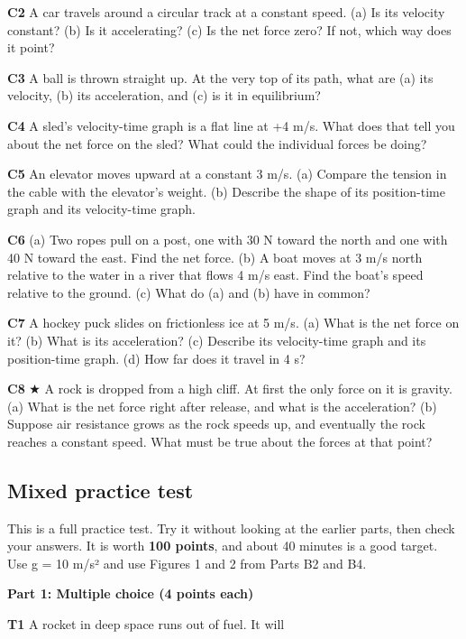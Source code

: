 \documentclass[
]{article}
\begin{document}
\textbf{C2} A car travels around a circular track at a constant speed.
(a) Is its velocity constant? (b) Is it accelerating? (c) Is the net
force zero? If not, which way does it point?

\textbf{C3} A ball is thrown straight up. At the very top of its path,
what are (a) its velocity, (b) its acceleration, and (c) is it in
equilibrium?

\textbf{C4} A sled's velocity-time graph is a flat line at +4 m/s. What
does that tell you about the net force on the sled? What could the
individual forces be doing?

\textbf{C5} An elevator moves upward at a constant 3 m/s. (a) Compare
the tension in the cable with the elevator's weight. (b) Describe the
shape of its position-time graph and its velocity-time graph.

\textbf{C6} (a) Two ropes pull on a post, one with 30 N toward the north
and one with 40 N toward the east. Find the net force. (b) A boat moves
at 3 m/s north relative to the water in a river that flows 4 m/s east.
Find the boat's speed relative to the ground. (c) What do (a) and (b)
have in common?

\textbf{C7} A hockey puck slides on frictionless ice at 5 m/s. (a) What
is the net force on it? (b) What is its acceleration? (c) Describe its
velocity-time graph and its position-time graph. (d) How far does it
travel in 4 s?

\textbf{C8} ★ A rock is dropped from a high cliff. At first the only
force on it is gravity. (a) What is the net force right after release,
and what is the acceleration? (b) Suppose air resistance grows as the
rock speeds up, and eventually the rock reaches a constant speed. What
must be true about the forces at that point?

\subsection{Mixed practice test}\label{mixed-practice-test}

This is a full practice test. Try it without looking at the earlier
parts, then check your answers. It is worth \textbf{100 points}, and
about 40 minutes is a good target. Use g = 10 m/s² and use Figures 1 and
2 from Parts B2 and B4.

\textbf{Part 1: Multiple choice (4 points each)}

\textbf{T1} A rocket in deep space runs out of fuel. It will
\end{document}

